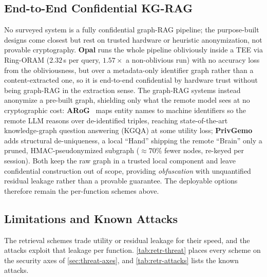 \subsection{End-to-End Confidential KG-RAG}
\label{ssec:retr-e2e}
No surveyed system is a fully confidential graph-RAG pipeline; the purpose-built designs come
closest but rest on trusted hardware or heuristic anonymization, not provable cryptography.
\textbf{Opal} runs the whole pipeline obliviously inside a TEE via Ring-ORAM ($2.32$\,s per query,
$1.57\times$ a non-oblivious run) with no accuracy loss from the obliviousness, but over a metadata-only
identifier graph rather than a content-extracted one, so it is end-to-end confidential by hardware
trust without being graph-RAG in the extraction sense. The graph-RAG systems instead anonymize a
pre-built graph, shielding only what the remote model sees at no cryptographic cost:
\textbf{ARoG}~\citep{ning_arog} maps entity names to machine identifiers so the remote LLM reasons
over de-identified triples, reaching state-of-the-art knowledge-graph question answering (KGQA) at
some utility loss; \textbf{PrivGemo}~\citep{tan_privgemo} adds structural de-uniqueness, a local
``Hand'' shipping the remote ``Brain'' only a pruned, HMAC-pseudonymized subgraph
(${\approx}70\%$ fewer nodes, re-keyed per session). Both keep the raw graph in a trusted local
component and leave confidential construction out of scope, providing \emph{obfuscation} with
unquantified residual leakage rather than a provable guarantee. The deployable options therefore
remain the per-function schemes above.

\subsection{Limitations and Known Attacks}
\label{ssec:retr-limits}

The retrieval schemes trade utility or residual leakage for their speed, and the attacks exploit
that leakage per function. \cref{tab:retr-threat} places every scheme on the security axes of
\cref{sec:threat-axes}, and \cref{tab:retr-attacks} lists the known attacks.

